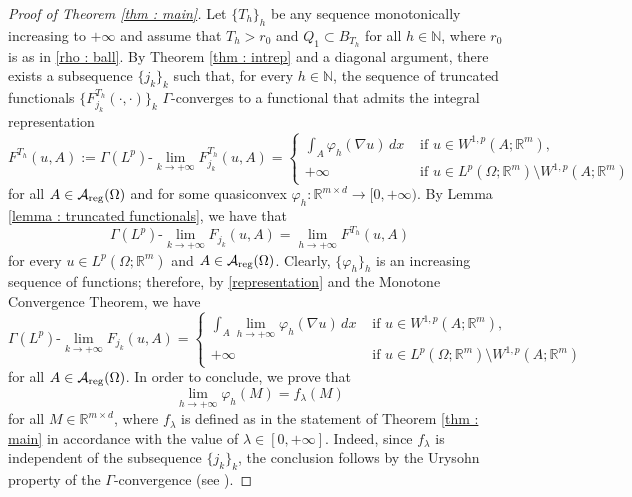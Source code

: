 \documentclass{article}
\theoremstyle{definition}
\newcommand{\f}{\varphi}
\newcommand{\N}{\mathbb{N}}
\newcommand{\R}{\mathbb{R}}
\newcommand{\A}{\mathcal{A}}
\begin{document}
\begin{proof}[Proof of Theorem \ref{thm : main}]

Let $\{T_h\}_h$ be any sequence monotonically increasing to $+\infty$ and assume that $T_h>r_0$ and $Q_1\subset B_{T_h}$ for all $h\in\N$, where $r_0$ is as in \eqref{rho : ball}. By Theorem \ref{thm : intrep} and a diagonal argument, there exists a subsequence $\{j_k\}_k$ such that, for every $h\in\N$, the sequence of truncated functionals $\{F_{j_k}^{T_h}(\cdot,\cdot)\}_k$ $\Gamma$-converges to a functional that admits the integral representation 
\begin{equation}\label{representation}
   F^{T_h}(u,A) := \Gamma(L^p)\text{-}\lim_{k\to+\infty} F_{j_k}^{T_h}(u,A) = \begin{cases}
            \displaystyle \int_{A} \f_h(\nabla u)\,dx & \text{ if } u\in W^{1,p}(A;\R^m), \\
            +\infty & \text{ if } u\in L^p(\Omega;\R^m)\setminus W^{1,p}(A;\R^m)
        \end{cases}
\end{equation}
for all $A\in \A_{\rm reg}(\Omega)$ and for some quasiconvex $\f_h: \R^{m\times d}\to [0,+\infty)$. By Lemma \ref{lemma : truncated functionals}, we have that \begin{equation*}
   \Gamma(L^p)\text{-}\lim_{k\to+\infty} F_{j_k}(u,A) =\lim_{h\to+\infty} F^{T_h}(u,A) 
\end{equation*}
for every $u\in L^p(\Omega; \R^m)$ and $A\in \A_{\rm reg}(\Omega)$. Clearly, $\{\f_h\}_h$ is an increasing sequence of functions; therefore, by \eqref{representation} and the Monotone Convergence Theorem, we have
\begin{equation*}
   \Gamma(L^p)\text{-}\lim_{k\to+\infty} F_{j_k}(u,A) =  \begin{cases}
            \displaystyle \int_{A} \lim_{h\to+\infty}\f_h(\nabla u)\,dx & \text{ if } u\in W^{1,p}(A;\R^m), \\
            +\infty & \text{ if } u\in L^p(\Omega;\R^m)\setminus W^{1,p}(A;\R^m)
            \end{cases}
\end{equation*}
for all $A\in \A_{\rm reg}(\Omega)$. In order to conclude, we prove that
\begin{equation*}
    \lim_{h\to+\infty}\f_h(M)= f_\lambda(M)
\end{equation*}
for all $M\in \R^{m \times d}$, where $f_\lambda$ is defined as in the statement of Theorem \ref{thm : main} in accordance with the value of $\lambda\in [0,+\infty]$. Indeed, since $f_\lambda$ is independent of the subsequence $\{j_k\}_k$, the conclusion follows by the Urysohn property of the $\Gamma$-convergence (see \cite{DM}).


\end{proof}
\end{document}
